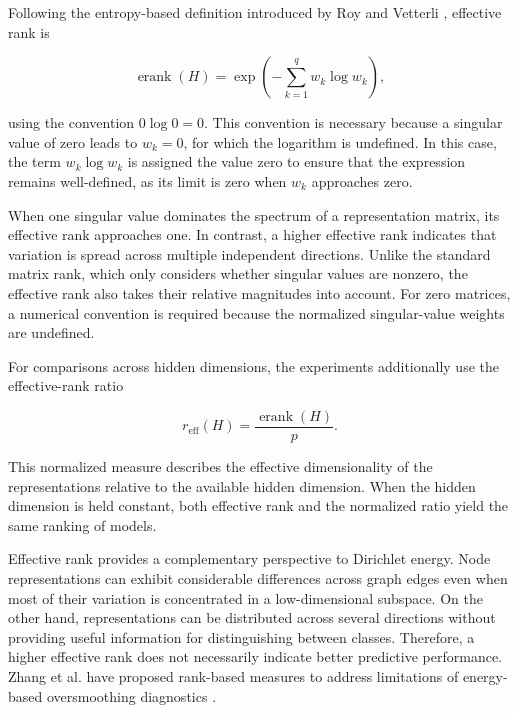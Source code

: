 \documentclass[english]{lni}
\begin{document}
Following the entropy-based definition introduced by Roy and Vetterli \cite{roy2007effective}, effective rank is

\begin{equation}
\operatorname{erank}(H)
=
\exp\left(
-\sum_{k=1}^{q}w_k\log w_k
\right),
\label{eq:effective-rank}
\end{equation}

using the convention $0\log 0=0$. This convention is necessary because a singular value of zero leads to $w_k=0$, for which the logarithm is undefined. In this case, the term $w_k\log w_k$ is assigned the value zero to ensure that the expression remains well-defined, as its limit is zero when $w_k$ approaches zero.

When one singular value dominates the spectrum of a representation matrix, its effective rank approaches one. In contrast, a higher effective rank indicates that variation is spread across multiple independent directions. Unlike the standard matrix rank, which only considers whether singular values are nonzero, the effective rank also takes their relative magnitudes into account. For zero matrices, a numerical convention is required because the normalized singular-value weights are undefined.

For comparisons across hidden dimensions, the experiments additionally use the effective-rank ratio

\begin{equation}
r_{\mathrm{eff}}(H)
=
\frac{\operatorname{erank}(H)}{p}.
\label{eq:effective-rank-ratio}
\end{equation}

This normalized measure describes the effective dimensionality of the representations relative to the available hidden dimension. When the hidden dimension is held constant, both effective rank and the normalized ratio yield the same ranking of models.

Effective rank provides a complementary perspective to Dirichlet energy. Node representations can exhibit considerable differences across graph edges even when most of their variation is concentrated in a low-dimensional subspace. On the other hand, representations can be distributed across several directions without providing useful information for distinguishing between classes. Therefore, a higher effective rank does not necessarily indicate better predictive performance. Zhang et al. have proposed rank-based measures to address limitations of energy-based oversmoothing diagnostics \cite{zhang2026measuring}.
\end{document}
